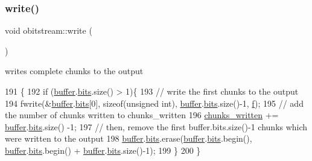 \subsubsection{\texorpdfstring{write()}{write()}}
{\footnotesize\ttfamily void obitstream\+::write (\begin{DoxyParamCaption}{ }\end{DoxyParamCaption})\hspace{0.3cm}{\ttfamily [private]}}



writes complete chunks to the output 


\begin{DoxyCode}
191                       \{
192   \textcolor{keywordflow}{if} (\hyperlink{classobitstream_aeaccad00a395a404aa16472bfa052be3}{buffer}.\hyperlink{classbit__pipe_a86f38af1e9736b053728033490476b50}{bits}.size() > 1)\{
193     \textcolor{comment}{// write the first chunks to the output}
194     fwrite(&\hyperlink{classobitstream_aeaccad00a395a404aa16472bfa052be3}{buffer}.\hyperlink{classbit__pipe_a86f38af1e9736b053728033490476b50}{bits}[0], \textcolor{keyword}{sizeof}(\textcolor{keywordtype}{unsigned} \textcolor{keywordtype}{int}), \hyperlink{classobitstream_aeaccad00a395a404aa16472bfa052be3}{buffer}.\hyperlink{classbit__pipe_a86f38af1e9736b053728033490476b50}{bits}.size()-1, 
      \hyperlink{classobitstream_ac589d74745217748c888ae777ab324a7}{f});
195     \textcolor{comment}{// add the number of chunks written to chunks\_written}
196     \hyperlink{classobitstream_a3022397f2b6133ea5990016d9d078a2f}{chunks\_written} += \hyperlink{classobitstream_aeaccad00a395a404aa16472bfa052be3}{buffer}.\hyperlink{classbit__pipe_a86f38af1e9736b053728033490476b50}{bits}.size() -1;
197     \textcolor{comment}{// then, remove the first buffer.bits.size()-1 chunks which were written to the output}
198     \hyperlink{classobitstream_aeaccad00a395a404aa16472bfa052be3}{buffer}.\hyperlink{classbit__pipe_a86f38af1e9736b053728033490476b50}{bits}.erase(\hyperlink{classobitstream_aeaccad00a395a404aa16472bfa052be3}{buffer}.\hyperlink{classbit__pipe_a86f38af1e9736b053728033490476b50}{bits}.begin(), \hyperlink{classobitstream_aeaccad00a395a404aa16472bfa052be3}{buffer}.\hyperlink{classbit__pipe_a86f38af1e9736b053728033490476b50}{bits}.begin() + 
      \hyperlink{classobitstream_aeaccad00a395a404aa16472bfa052be3}{buffer}.\hyperlink{classbit__pipe_a86f38af1e9736b053728033490476b50}{bits}.size()-1); 
199   \}
200 \}
\end{DoxyCode}
\mbox{\label{classobitstream_afb0cc2fb4f739881436d887bd4770355}} 

